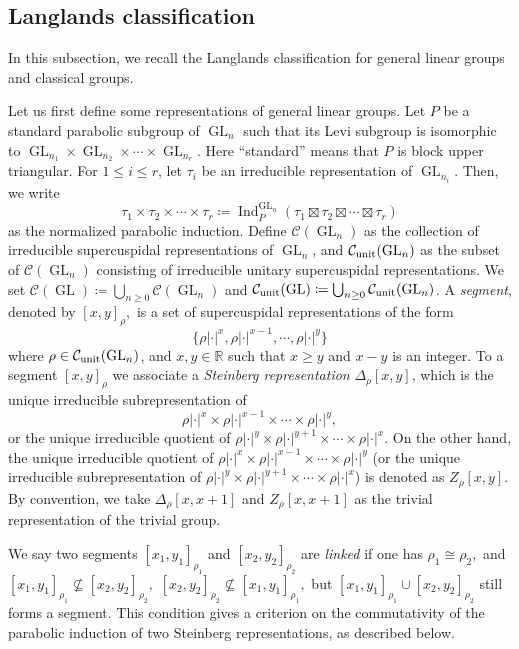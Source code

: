 \documentclass[11pt,letterpaper]{amsart}
\theoremstyle{plain}
\numberwithin{theorem}{section}
\numberwithin{equation}{subsection}
\theoremstyle{remark}
\newcommand{\GL}{\operatorname{GL}}
\newcommand{\Ind}{\operatorname{Ind}}
\newcommand{\R}{\mathbb{R}}
\newcommand{\unit}{{\rm unit}}
\def\calC{\mathcal{C}}
\begin{document}
\vskip 5pt

\subsection{Langlands classification} 

In this subsection, we recall the Langlands classification for general linear groups and classical groups.

\vskip 5pt

Let us first define some representations of general linear groups. Let \(P\) be a standard parabolic subgroup of $\GL_n$ such that its Levi subgroup is isomorphic to \(\GL_{n_1}\times \GL_{n_2}\times\cdots\times\GL_{n_r}\). Here ``standard'' means that $P$ is block upper triangular. For \(1\leq i\leq r\), let \(\tau_i\) be an irreducible representation of \(\GL_{n_i}.\) Then, we write
\[
    \tau_1\times \tau_2\times\cdots\times\tau_r\coloneqq\Ind^{\GL_n}_{P}\left(\tau_1\boxtimes\tau_2\boxtimes\cdots\boxtimes\tau_r\right)
\]
as the normalized parabolic induction. Define \(\calC(\GL_n)\) as the collection of irreducible supercuspidal representations of \(\GL_n\), and \(\calC_{\unit}(\GL_n)\) as the subset of $\calC(\GL_n)$ consisting of irreducible unitary supercuspidal representations. We set $\calC(\GL)\coloneqq \bigcup_{n\geq 0}\calC(\GL_n)$ and $\calC_{\unit}(\GL)\coloneqq \bigcup_{n\geq 0}\calC_{\unit}(\GL_n)$. A \emph{segment}, denoted by \([x,y]_{\rho},\) is a set of supercuspidal representations of the form
\[
    \{\rho|\cdot|^x,\rho|\cdot|^{x-1},\cdots,\rho|\cdot|^y\}
\]
where \(\rho\in\calC_{\unit}(\GL_n)\), and \(x,y\in\R\) such that \(x\geq y\) and \(x-y\) is an integer. To a segment \([x,y]_{\rho}\) we associate a \emph{Steinberg representation} \(\Delta_{\rho}[x,y]\), which is the unique irreducible subrepresentation of 
\[
    \rho|\cdot|^x\times\rho|\cdot|^{x-1}\times\cdots\times\rho|\cdot|^y,
\] 
or the unique irreducible quotient of \(\rho|\cdot|^y\times\rho|\cdot|^{y+1}\times\cdots\times\rho|\cdot|^x.\) On the other hand, the unique irreducible quotient of \(\rho|\cdot|^x\times\rho|\cdot|^{x-1}\times\cdots\times\rho|\cdot|^y\) (or the unique irreducible subrepresentation of \(\rho|\cdot|^y\times\rho|\cdot|^{y+1}\times\cdots\times\rho|\cdot|^x\)) is denoted as \(Z_{\rho}[x,y].\) By convention, we take \(\Delta_{\rho}[x,x+1]\) and \(Z_{\rho}[x,x+1]\) as the trivial representation of the trivial group.

\vskip 5pt

We say two segments \([x_1,y_1]_{\rho_1}\) and \([x_2,y_2]_{\rho_2}\) are \emph{linked} if one has \(\rho_1\cong\rho_2,\) and \([x_1,y_1]_{\rho_1}\not\subseteq [x_2,y_2]_{\rho_2},\) \([x_2,y_2]_{\rho_2}\not\subseteq [x_1,y_1]_{\rho_1}, \) but \([x_1,y_1]_{\rho_1}\cup[x_2,y_2]_{\rho_2}\) still forms a segment. This condition gives a criterion on the commutativity of the parabolic induction of two Steinberg representations, as described below.
\end{document}

